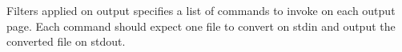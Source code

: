 \begin{configuration}{Filters applied on output}
specifies a list of commands to invoke on each output
page. Each command should expect one file to convert on stdin and output
the converted file on stdout.
\end{configuration}

